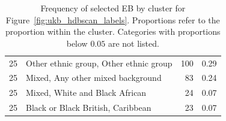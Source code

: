 \begin{table}[ht]
{\begin{tabular}[t]{rlrr}
   25 & Other ethnic group, Other ethnic group & 100 & 0.29 \\ 
   25 & Mixed, Any other mixed background &  83 & 0.24 \\ 
   25 & Mixed, White and Black African &  24 & 0.07 \\ 
   25 & Black or Black British, Caribbean &  23 & 0.07 \\ 
   \hline
\end{tabular}
}
\caption[Frequency of selected EB by cluster]{Frequency of selected EB by cluster for Figure~\ref{fig:ukb_hdbscan_labels}. Proportions refer to the proportion within the cluster. Categories with proportions below $0.05$ are not listed.}
\label{table:supp_ukb_cluster_sieb} 
\end{table} 
